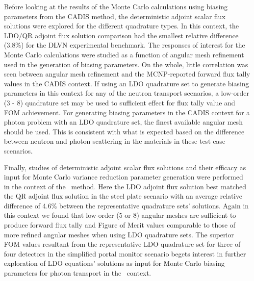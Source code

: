 Before looking at the results of the Monte Carlo calculations using biasing parameters from the
CADIS method, the deterministic adjoint scalar flux solutions were explored for the different
quadrature types. In this context, the LDO/QR adjoint flux solution comparison had the smallest 
relative difference (3.8\%) for the DLVN experimental benchmark. The responses of interest for
the Monte Carlo calculations were studied as a function of angular mesh refinement used in the
generation of biasing parameters. On the whole, little correlation was seen between angular 
mesh refinement and the MCNP-reported forward flux tally values in the CADIS context. If using
an LDO quadrature set to generate biasing parameters in this context for any of the neutron
transport scenarios, a low-order (3 - 8) quadrature set may be used to sufficient effect for
flux tally value and FOM achievement. For generating biasing parameters in the CADIS context for
a photon problem with an LDO quadrature set, the finest available angular mesh should be used.
This is consistent with what is expected based on the difference between neutron and photon 
scattering in the materials in these test case scenarios.

Finally, studies of deterministic adjoint scalar flux solutions and their efficacy as input for
Monte Carlo variance reduction parameter generation were performed in the context of the \fwc\
method. Here the LDO adjoint flux solution best matched the QR adjoint flux solution in the 
steel plate scenario with an
average relative difference of 4.6\% between the representative quadrature sets' solutions.
Again in this context we found that low-order (5 or 8) angular meshes are sufficient to produce 
forward flux tally and Figure of Merit values comparable to those of more refined angular meshes 
when using LDO quadrature sets. The superior FOM values resultant from the representative LDO
quadrature set for three of four detectors in the simplified portal monitor scenario begets
interest in further exploration of LDO equations' solutions as input for Monte Carlo biasing
parameters for photon transport in the \fwc\ context.
